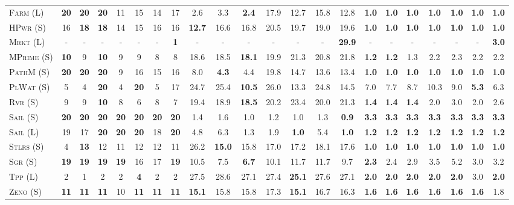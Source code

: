 \documentclass[11pt,landscape]{article}
\begin{document}
\begin{table*}[tb]
{\begin{tabular}{|l||ccccccc||ccccccc||ccccccc||}
\textsc{Farm} (L)&\textbf{20}&\textbf{20}&\textbf{20}&11&15&14&17&2.6&3.3&\textbf{2.4}&17.9&12.7&15.8&12.8&\textbf{1.0}&\textbf{1.0}&\textbf{1.0}&\textbf{1.0}&\textbf{1.0}&\textbf{1.0}&\textbf{1.0}\\
\textsc{HPwr} (S)&16&\textbf{18}&\textbf{18}&14&15&16&16&\textbf{12.7}&16.6&16.8&20.5&19.7&19.0&19.6&\textbf{1.0}&\textbf{1.0}&\textbf{1.0}&\textbf{1.0}&\textbf{1.0}&\textbf{1.0}&\textbf{1.0}\\
\textsc{Mrkt} (L)&-&-&-&-&-&-&\textbf{1}&-&-&-&-&-&-&\textbf{29.9}&-&-&-&-&-&-&\textbf{3.0}\\
\textsc{MPrime} (S)&\textbf{10}&9&\textbf{10}&9&9&8&8&18.6&18.5&\textbf{18.1}&19.9&21.3&20.8&21.8&\textbf{1.2}&\textbf{1.2}&1.3&2.2&2.3&2.2&2.2\\
\textsc{PathM} (S)&\textbf{20}&\textbf{20}&\textbf{20}&9&16&15&16&8.0&\textbf{4.3}&4.4&19.8&14.7&13.6&13.4&\textbf{1.0}&\textbf{1.0}&\textbf{1.0}&\textbf{1.0}&\textbf{1.0}&\textbf{1.0}&\textbf{1.0}\\
\textsc{PlWat} (S)&5&4&\textbf{20}&4&\textbf{20}&5&17&24.7&25.4&\textbf{10.5}&26.0&13.3&24.8&14.5&7.0&7.7&8.7&10.3&9.0&\textbf{5.3}&6.3\\
\textsc{Rvr} (S)&9&9&\textbf{10}&8&6&8&7&19.4&18.9&\textbf{18.5}&20.2&23.4&20.0&21.3&\textbf{1.4}&\textbf{1.4}&\textbf{1.4}&2.0&3.0&2.0&2.6\\
\textsc{Sail} (S)&\textbf{20}&\textbf{20}&\textbf{20}&\textbf{20}&\textbf{20}&\textbf{20}&\textbf{20}&1.4&1.6&1.0&1.2&1.0&1.3&\textbf{0.9}&\textbf{3.3}&\textbf{3.3}&\textbf{3.3}&\textbf{3.3}&\textbf{3.3}&\textbf{3.3}&\textbf{3.3}\\
\textsc{Sail} (L)&19&17&\textbf{20}&\textbf{20}&\textbf{20}&18&\textbf{20}&4.8&6.3&1.3&1.9&\textbf{1.0}&5.4&\textbf{1.0}&\textbf{1.2}&\textbf{1.2}&\textbf{1.2}&\textbf{1.2}&\textbf{1.2}&\textbf{1.2}&\textbf{1.2}\\
\textsc{Stlrs} (S)&4&\textbf{13}&12&11&12&12&11&26.2&\textbf{15.0}&15.8&17.0&17.2&18.1&17.6&\textbf{1.0}&\textbf{1.0}&\textbf{1.0}&\textbf{1.0}&\textbf{1.0}&\textbf{1.0}&\textbf{1.0}\\
\textsc{Sgr} (S)&\textbf{19}&\textbf{19}&\textbf{19}&\textbf{19}&16&17&\textbf{19}&10.5&7.5&\textbf{6.7}&10.1&11.7&11.7&9.7&\textbf{2.3}&2.4&2.9&3.5&5.2&3.0&3.2\\
\textsc{Tpp} (L)&2&1&2&2&\textbf{4}&2&2&27.5&28.6&27.1&27.4&\textbf{25.1}&27.6&27.1&\textbf{2.0}&\textbf{2.0}&\textbf{2.0}&\textbf{2.0}&\textbf{2.0}&3.0&\textbf{2.0}\\
\textsc{Zeno} (S)&\textbf{11}&\textbf{11}&\textbf{11}&10&\textbf{11}&\textbf{11}&\textbf{11}&\textbf{15.1}&15.8&15.8&17.3&\textbf{15.1}&16.7&16.3&\textbf{1.6}&\textbf{1.6}&\textbf{1.6}&\textbf{1.6}&\textbf{1.6}&\textbf{1.6}&1.8\\

\end{tabular}}
\end{table*}
\end{document}
